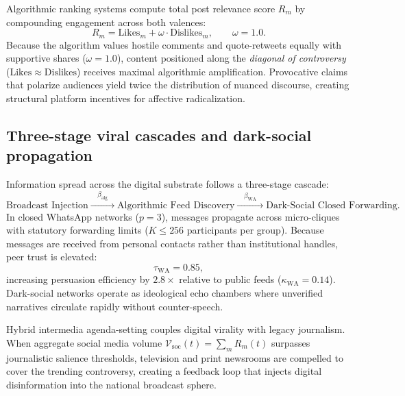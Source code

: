 \documentclass[11pt,a4paper]{article}
\begin{document}
Algorithmic ranking systems compute total post relevance score $R_m$ by compounding engagement across both valences:
\begin{equation}
    R_m = \mathrm{Likes}_m + \omega \cdot \mathrm{Dislikes}_m, \qquad \omega = 1.0.
    \label{eq:relevance_metric_full}
\end{equation}
Because the algorithm values hostile comments and quote-retweets equally with supportive shares ($\omega = 1.0$), content positioned along the \emph{diagonal of controversy} ($\mathrm{Likes} \approx \mathrm{Dislikes}$) receives maximal algorithmic amplification. Provocative claims that polarize audiences yield twice the distribution of nuanced discourse, creating structural platform incentives for affective radicalization.

\subsection{Three-stage viral cascades and dark-social propagation}
\label{sssec:viral_cascades_dark_social}
Information spread across the digital substrate follows a three-stage cascade:
\begin{equation}
    \text{Broadcast Injection} \xrightarrow{\quad\beta_{\mathrm{alg}}\quad} \text{Algorithmic Feed Discovery} \xrightarrow{\quad\beta_{\text{WA}}\quad} \text{Dark-Social Closed Forwarding}.
    \label{eq:cascade_stages}
\end{equation}
In closed WhatsApp networks ($p=3$), messages propagate across micro-cliques with statutory forwarding limits ($K \le 256$ participants per group). Because messages are received from personal contacts rather than institutional handles, peer trust is elevated:
\begin{equation}
    \tau_{\text{WA}} = 0.85,
    \label{eq:whatsapp_trust_weight}
\end{equation}
increasing persuasion efficiency by $2.8\times$ relative to public feeds ($\kappa_{\text{WA}} = 0.14$). Dark-social networks operate as ideological echo chambers where unverified narratives circulate rapidly without counter-speech.

Hybrid intermedia agenda-setting couples digital virality with legacy journalism. When aggregate social media volume $\mathcal{V}_{\mathrm{soc}}(t) = \sum_m R_m(t)$ surpasses journalistic salience thresholds, television and print newsrooms are compelled to cover the trending controversy, creating a feedback loop that injects digital disinformation into the national broadcast sphere.
\end{document}
